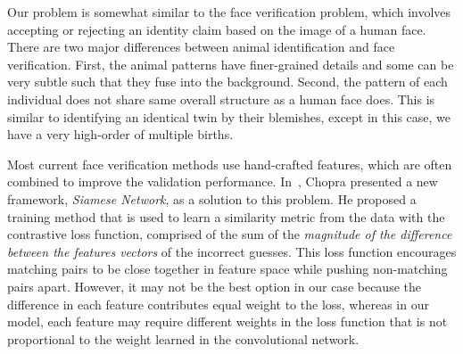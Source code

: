   Our problem is somewhat similar to the face verification problem, which
  involves accepting or rejecting an identity claim based on the image of a human
  face. There are two major differences between animal identification and face
  verification. First, the animal patterns have finer-grained details and some can
  be very subtle such that they fuse into the background. Second, the pattern of each
  individual does not share same overall structure as a human face does. This is
  similar to identifying an identical twin by their blemishes, except in this
  case, we have a very high-order of multiple births.

  Most current face verification methods use hand-crafted features, which are
  often combined to improve the validation performance. In~\cite{chopra05},
  Chopra presented a new framework, \emph{Siamese Network}, as a solution to this
  problem. He proposed a training method that is used to learn a similarity
  metric from the data with the contrastive loss function, comprised of the sum
  of the \emph{magnitude of the difference between the features vectors} of the
  incorrect guesses. This loss function encourages matching pairs to be close
  together in feature space while pushing non-matching pairs apart. However, it
  may not be the best option in our case because the difference in each feature
  contributes equal weight to the loss, whereas in our model, each feature may
  require different weights in the loss function that is not proportional to the
  weight learned in the convolutional network.



